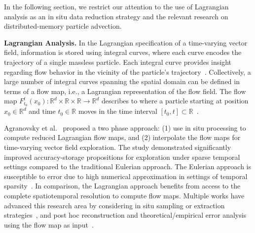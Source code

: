 In the following section, we restrict our attention to the use of Lagrangian analysis as an in situ data reduction strategy and the relevant research on distributed-memory particle advection.

\textbf{Lagrangian Analysis.}
%
In the Lagrangian specification of a time-varying vector field, information is stored using integral curves, where each curve encodes the trajectory of a single massless particle.
%
Each integral curve provides insight regarding flow behavior in the vicinity of the particle's trajectory~\cite{bujack2015lagrangian}.
%
Collectively, a large number of integral curves spanning the spatial domain can be defined in terms of a flow map, i.e., a Lagrangian representation of the flow field.
%
The flow map $F_{t_0}^{t}(x_0):\mathbb R^d \times \mathbb R \times \mathbb R  \to \mathbb R^d$ describes to where a particle starting at position $x_0\in \mathbb R^d$ and time $t_0\in \mathbb R$ moves in the time interval $[t_0,t]\subset \mathbb R$~\cite{garth2007efficient}.
%

%
Agranovsky et al.~\cite{agranovsky2014improved} proposed a two phase approach: (1) use in situ processing to compute reduced Lagrangian flow maps, and (2) interpolate the flow maps for time-varying vector field exploration.
%
The study demonstrated significantly improved accuracy-storage propositions for exploration under sparse temporal settings compared to the traditional Eulerian approach.
%
The Eulerian approach is susceptible to error due to high numerical approximation in settings of temporal sparsity~\cite{costa2004lagrangian,Qin2014,agranovsky2014improved,sane2018revisiting}. 
%
In comparison, the Lagrangian approach benefits from access to the complete spatiotemporal resolution to compute flow maps.
%
Multiple works have advanced this research area by considering in situ sampling or extraction strategies~\cite{sane2019interpolation, rapp2019void}, and post hoc reconstruction and theoretical/empirical error analysis using the flow map as input~\cite{hlawatsch2011hierarchical, bujack2015lagrangian, chandler2015interpolation, chandler2016analysis, hummel2016error, sane2018revisiting, sane2019interpolation, rapp2019void, jakob2020fluid}.

